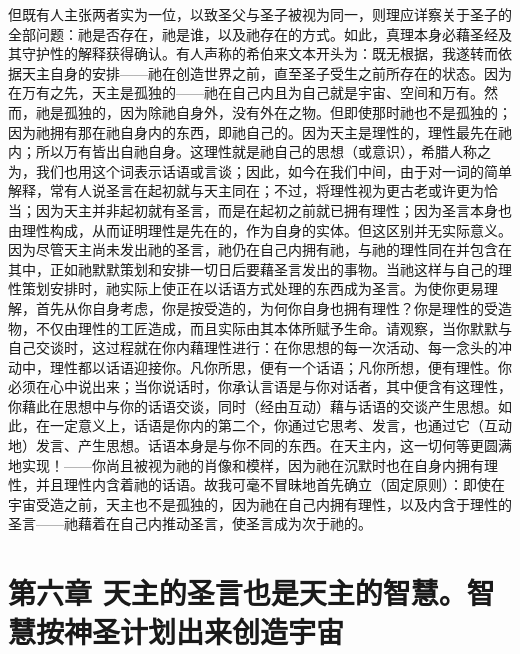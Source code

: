但既有人主张两者实为一位，以致圣父与圣子被视为同一，则理应详察关于圣子的全部问题：祂是否存在，祂是谁，以及祂存在的方式。如此，真理本身必藉圣经及其守护性的解释获得确认。有人声称的希伯来文本开头为：既无根据，我遂转而依据天主自身的安排——祂在创造世界之前，直至圣子受生之前所存在的状态。因为在万有之先，天主是孤独的——祂在自己内且为自己就是宇宙、空间和万有。然而，祂是孤独的，因为除祂自身外，没有外在之物。但即使那时祂也不是孤独的；因为祂拥有那在祂自身内的东西，即祂自己的。因为天主是理性的，理性最先在祂内；所以万有皆出自祂自身。这理性就是祂自己的思想（或意识），希腊人称之为，我们也用这个词表示话语或言谈；因此，如今在我们中间，由于对一词的简单解释，常有人说圣言在起初就与天主同在；不过，将理性视为更古老或许更为恰当；因为天主并非起初就有圣言，而是在起初之前就已拥有理性；因为圣言本身也由理性构成，从而证明理性是先在的，作为自身的实体。但这区别并无实际意义。因为尽管天主尚未发出祂的圣言，祂仍在自己内拥有祂，与祂的理性同在并包含在其中，正如祂默默策划和安排一切日后要藉圣言发出的事物。当祂这样与自己的理性策划安排时，祂实际上使正在以话语方式处理的东西成为圣言。为使你更易理解，首先从你自身考虑，你是按受造的，为何你自身也拥有理性？你是理性的受造物，不仅由理性的工匠造成，而且实际由其本体所赋予生命。请观察，当你默默与自己交谈时，这过程就在你内藉理性进行：在你思想的每一次活动、每一念头的冲动中，理性都以话语迎接你。凡你所思，便有一个话语；凡你所想，便有理性。你必须在心中说出来；当你说话时，你承认言语是与你对话者，其中便含有这理性，你藉此在思想中与你的话语交谈，同时（经由互动）藉与话语的交谈产生思想。如此，在一定意义上，话语是你内的第二个，你通过它思考、发言，也通过它（互动地）发言、产生思想。话语本身是与你不同的东西。在天主内，这一切何等更圆满地实现！——你尚且被视为祂的肖像和模样，因为祂在沉默时也在自身内拥有理性，并且理性内含着祂的话语。故我可毫不冒昧地首先确立（固定原则）：即使在宇宙受造之前，天主也不是孤独的，因为祂在自己内拥有理性，以及内含于理性的圣言——祂藉着在自己内推动圣言，使圣言成为次于祂的。\par


\section{第六章 天主的圣言也是天主的智慧。智慧按神圣计划出来创造宇宙}

